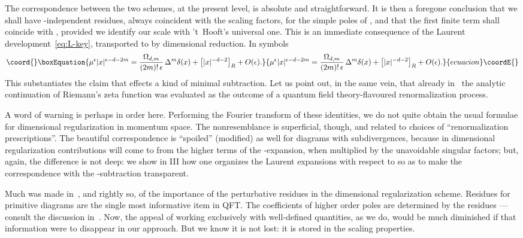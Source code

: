 \documentclass[a4paper,12pt]{article}
\providecommand{\Dl}{\Delta}           %
\providecommand{\dl}{\delta}           %
\providecommand{\eps}{\epsilon}        %
\providecommand{\R}{\mathbb{R}}        %
\providecommand{\7}{\dagger}           %
\theoremstyle{plain}
\theoremstyle{definition}
\begin{document}
The correspondence between the two schemes, at the present level, is
absolute and straightforward. It is then a foregone conclusion that we
shall have \myHighlight{$\mu$}\coordHE{}-independent residues, always coincident with the
scaling factors, for the simple poles of \coordHE{}, and that the
first finite term shall coincide with \coordHE{}, provided we identify
our scale with 't~Hooft's universal one. This is an immediate
consequence of the Laurent development~\eqref{eq:L-key}, transported
to \myHighlight{$\R^d$}\coordHE{} by dimensional reduction. In symbols
\begin{equation}\coord{}\boxEquation{
\mu^\eps |x|^{\eps-d-2m} =
\frac{\Omega_{d,m}}{(2m)!\,\eps}\,\Dl^m\dl(x)
+ \bigl[|x|^{-d-2}\bigr]_R + O(\eps).
\label{eq:dim-par}
}{
\mu^\eps |x|^{\eps-d-2m} =
\frac{\Omega_{d,m}}{(2m)!\,\eps}\,\Dl^m\dl(x)
+ \bigl[|x|^{-d-2}\bigr]_R + O(\eps).
}{ecuacion}\coordE{}\end{equation}
This substantiates the claim that \coordHE{} effects a kind of minimal
subtraction. Let us point out, in the same vein, that already
in~\cite{Odysseus} the analytic continuation of Riemann's zeta
function was evaluated as the outcome of a quantum field
theory-flavoured renormalization process.

A word of warning is perhaps in order here. Performing the Fourier
transform of these identities, we do not quite obtain the usual
formulae for dimensional regularization in momentum space. The
nonresemblance is superficial, though, and related to choices of
``renormalization prescriptions''. The beautiful correspondence is
``spoiled'' (modified) as well for diagrams with subdivergences,
because in dimensional regularization contributions will come to
\myHighlight{$O(\eps^0)$}\coordHE{} from the higher terms of the \myHighlight{$\eps$}\coordHE{}-expansion, when
multiplied by the unavoidable singular factors; but, again, the
difference is not deep: we show in III how one organizes the Laurent
expansions with respect to \coordHE{} so as to make the correspondence with
the \coordHE{}-subtraction transparent.

Much was made in~\cite{DirkResidue}, and rightly so, of the importance
of the perturbative residues in the dimensional regularization scheme.
Residues for primitive diagrams are the single most informative item
in QFT. The coefficients of higher order poles are determined by the
residues ---consult the discussion in~\cite{Gross}. Now, the appeal of
working exclusively with well-defined quantities, as we do, would be
much diminished if that information were to disappear in our approach.
But we know it is not lost: it is stored in the scaling properties.
\end{document}
